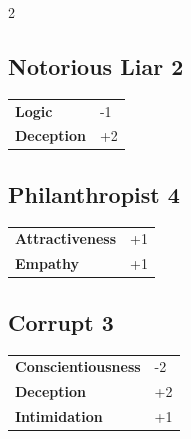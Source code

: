 \begin{multicols}{2}
\begin{tcolorbox}
\end{tcolorbox}

\begin{tcolorbox}
    \subsection*{Notorious Liar \hfill \small{2 }}
    \tcblower




\begin{tabular}{@{}ll@{}}
    \textbf{Logic} & -1\\
    \textbf{Deception} & +2\\
\end{tabular}


\end{tcolorbox}

\begin{tcolorbox}
    \subsection*{Philanthropist \hfill \small{4 }}
    \tcblower




\begin{tabular}{@{}ll@{}}
    \textbf{Attractiveness} & +1\\
    \textbf{Empathy} & +1\\
\end{tabular}


\end{tcolorbox}

\begin{tcolorbox}
    \subsection*{Corrupt \hfill \small{3 }}
    \tcblower




\begin{tabular}{@{}ll@{}}
    \textbf{Conscientiousness} & -2\\
    \textbf{Deception} & +2\\
    \textbf{Intimidation} & +1\\
\end{tabular}


\end{tcolorbox}
\end{multicols}
